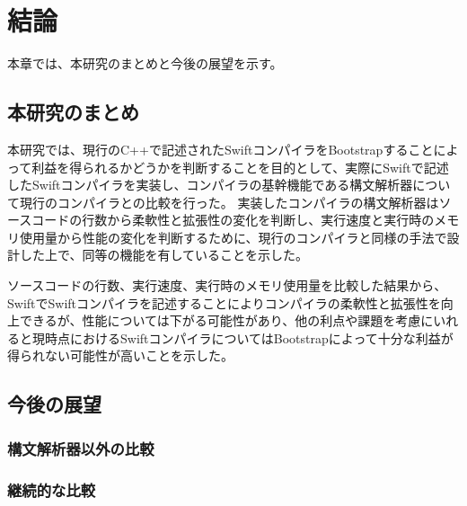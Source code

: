 \chapter{結論}
\label{conclusion}

本章では、本研究のまとめと今後の展望を示す。

\section{本研究のまとめ}

本研究では、現行のC++で記述されたSwiftコンパイラをBootstrapすることによって利益を得られるかどうかを判断することを目的として、実際にSwiftで記述したSwiftコンパイラを実装し、コンパイラの基幹機能である構文解析器について現行のコンパイラとの比較を行った。
実装したコンパイラの構文解析器はソースコードの行数から柔軟性と拡張性の変化を判断し、実行速度と実行時のメモリ使用量から性能の変化を判断するために、現行のコンパイラと同様の手法で設計した上で、同等の機能を有していることを示した。

ソースコードの行数、実行速度、実行時のメモリ使用量を比較した結果から、SwiftでSwiftコンパイラを記述することによりコンパイラの柔軟性と拡張性を向上できるが、性能については下がる可能性があり、他の利点や課題を考慮にいれると現時点におけるSwiftコンパイラについてはBootstrapによって十分な利益が得られない可能性が高いことを示した。


\section{今後の展望}

\subsection{構文解析器以外の比較}

\subsection{継続的な比較}

